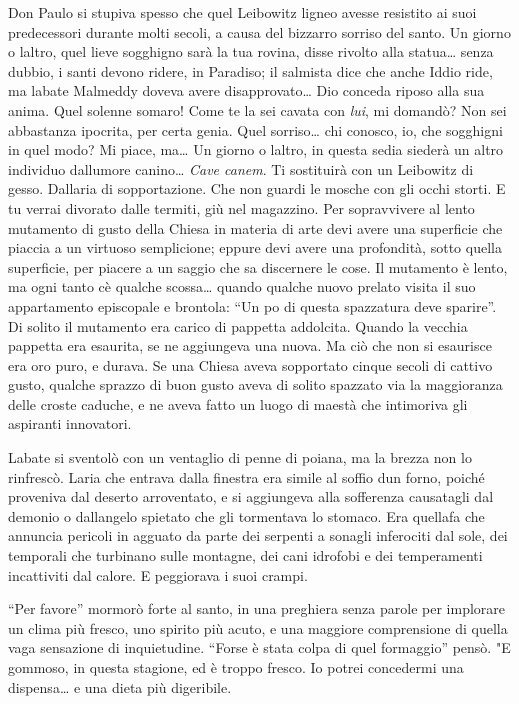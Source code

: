 Don Paulo si stupiva spesso che quel Leibowitz ligneo avesse resistito
ai suoi predecessori durante molti secoli, a causa del bizzarro sorriso
del santo. Un giorno o l\textquotesingle altro, quel lieve sogghigno
sarà la tua rovina, disse rivolto alla statua\ldots{} senza dubbio, i
santi devono ridere, in Paradiso; il salmista dice che anche Iddio ride,
ma l\textquotesingle abate Malmeddy doveva avere disapprovato\ldots{}
Dio conceda riposo alla sua anima. Quel solenne somaro! Come te la sei
cavata con \emph{lui}, mi domandò? Non sei abbastanza ipocrita, per
certa genia. Quel sorriso\ldots{} chi conosco, io, che sogghigni in quel
modo? Mi piace, ma\ldots{} Un giorno o l\textquotesingle altro, in
questa sedia siederà un altro individuo dall\textquotesingle umore
canino\ldots{} \emph{Cave canem}. Ti sostituirà con un Leibowitz di
gesso. Dall\textquotesingle aria di sopportazione. Che non guardi le
mosche con gli occhi storti. E tu verrai divorato dalle termiti, giù nel
magazzino. Per sopravvivere al lento mutamento di gusto della Chiesa in
materia di arte devi avere una superficie che piaccia a un virtuoso
semplicione; eppure devi avere una profondità, sotto quella superficie,
per piacere a un saggio che sa discernere le cose. Il mutamento è lento,
ma ogni tanto c\textquotesingle è qualche scossa\ldots{} quando qualche
nuovo prelato visita il suo appartamento episcopale e brontola: ``Un
po\textquotesingle{} di questa spazzatura deve sparire''. Di solito il
mutamento era carico di pappetta addolcita. Quando la vecchia pappetta
era esaurita, se ne aggiungeva una nuova. Ma ciò che non si esaurisce
era oro puro, e durava. Se una Chiesa aveva sopportato cinque secoli di
cattivo gusto, qualche sprazzo di buon gusto aveva di solito spazzato
via la maggioranza delle croste caduche, e ne aveva fatto un luogo di
maestà che intimoriva gli aspiranti innovatori.

L\textquotesingle abate si sventolò con un ventaglio di penne di poiana,
ma la brezza non lo rinfrescò. L\textquotesingle aria che entrava dalla
finestra era simile al soffio d\textquotesingle un forno, poiché
proveniva dal deserto arroventato, e si aggiungeva alla sofferenza
causatagli dal demonio o dall\textquotesingle angelo spietato che gli
tormentava lo stomaco. Era quell\textquotesingle afa che annuncia
pericoli in agguato da parte dei serpenti a sonagli inferociti dal sole,
dei temporali che turbinano sulle montagne, dei cani idrofobi e dei
temperamenti incattiviti dal calore. E peggiorava i suoi crampi.

``Per favore'' mormorò forte al santo, in una preghiera senza parole per
implorare un clima più fresco, uno spirito più acuto, e una maggiore
comprensione di quella vaga sensazione di inquietudine. ``Forse è stata
colpa di quel formaggio'' pensò. "E gommoso, in questa stagione, ed è
troppo fresco. Io potrei concedermi una dispensa\ldots{} e una dieta più
digeribile.

